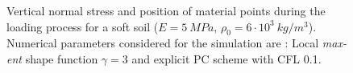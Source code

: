 \begin{figure}
{    \label{fig:Block-LME3-PCE-t025}
  }
  \qquad
  \caption{Vertical normal stress and position of material points
    during the loading process for a soft soil ($E = 5\ MPa$, $\rho_0
    = 6\cdot 10^3\ kg/m^3$). Numerical parameters considered for the
    simulation are : Local \textit{max-ent} shape function $\gamma =3$
    and explicit PC scheme with CFL 0.1.}
  \label{fig:Block-LME3}
\end{figure}





